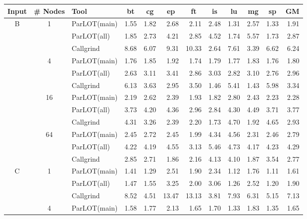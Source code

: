 \begin{table*}[]
\label{comet_sd_pMpAcg_BC_int_p3.5}
\begin{center}
\begin{tabular}{|c|c|l|rrrrrrrr|r|}
\hline
\multicolumn{1}{|l|}{Input} & \multicolumn{1}{l|}{\# Nodes} & Tool & \multicolumn{1}{c}{bt} & \multicolumn{1}{c}{cg} & \multicolumn{1}{c}{ep} & \multicolumn{1}{c}{ft} & \multicolumn{1}{c}{is} & \multicolumn{1}{c}{lu} & \multicolumn{1}{c}{mg} & \multicolumn{1}{c|}{sp} & \multicolumn{1}{c|}{GM} \\ \hline
\multirow{12}{*}{B} & \multirow{3}{*}{1} & ParLOT(main) & 1.55 & 1.82 & 2.68 & 2.11 & 2.48 & 1.31 & 2.57 & 1.33 & 1.91 \\
 &  & ParLOT(all) & 1.85 & 2.73 & 4.21 & 2.85 & 4.52 & 1.74 & 5.57 & 1.73 & 2.87 \\
 &  & Callgrind & 8.68 & 6.07 & 9.31 & 10.33 & 2.64 & 7.61 & 3.39 & 6.62 & 6.24 \\ \cline{2-12} 
 & \multirow{3}{*}{4} & ParLOT(main) & 1.76 & 1.85 & 1.92 & 1.74 & 1.79 & 1.77 & 1.83 & 1.76 & 1.80 \\
 &  & ParLOT(all) & 2.63 & 3.11 & 3.41 & 2.86 & 3.03 & 2.82 & 3.10 & 2.76 & 2.96 \\
 &  & Callgrind & 6.13 & 3.63 & 2.95 & 3.50 & 1.46 & 5.41 & 1.43 & 5.98 & 3.34 \\ \cline{2-12} 
 & \multirow{3}{*}{16} & ParLOT(main) & 2.19 & 2.62 & 2.39 & 1.93 & 1.82 & 2.80 & 2.43 & 2.23 & 2.28 \\
 &  & ParLOT(all) & 3.73 & 4.20 & 4.36 & 2.96 & 2.84 & 4.30 & 4.49 & 3.71 & 3.77 \\
 &  & Callgrind & 4.31 & 3.26 & 2.39 & 2.20 & 1.73 & 4.70 & 1.92 & 4.65 & 2.93 \\ \cline{2-12} 
 & \multirow{3}{*}{64} & ParLOT(main) & 2.45 & 2.72 & 2.45 & 1.99 & 4.34 & 4.56 & 2.31 & 2.46 & 2.79 \\
 &  & ParLOT(all) & 4.22 & 4.19 & 4.55 & 3.13 & 5.46 & 4.73 & 4.17 & 4.23 & 4.29 \\
 &  & Callgrind & 2.85 & 2.71 & 1.86 & 2.16 & 4.13 & 4.10 & 1.87 & 3.54 & 2.77 \\ \hline
\multirow{12}{*}{C} & \multirow{3}{*}{1} & ParLOT(main) & 1.41 & 1.29 & 2.51 & 1.90 & 2.34 & 1.12 & 1.76 & 1.11 & 1.61 \\
 &  & ParLOT(all) & 1.47 & 1.55 & 3.25 & 2.00 & 3.06 & 1.26 & 2.52 & 1.20 & 1.90 \\
 &  & Callgrind & 8.52 & 4.51 & 13.47 & 13.13 & 3.81 & 7.93 & 6.31 & 5.15 & 7.13 \\ \cline{2-12} 
 & \multirow{3}{*}{4} & ParLOT(main) & 1.58 & 1.77 & 2.13 & 1.65 & 1.70 & 1.33 & 1.83 & 1.35 & 1.65 \\

\end{tabular}
\end{center}
\end{table*}
